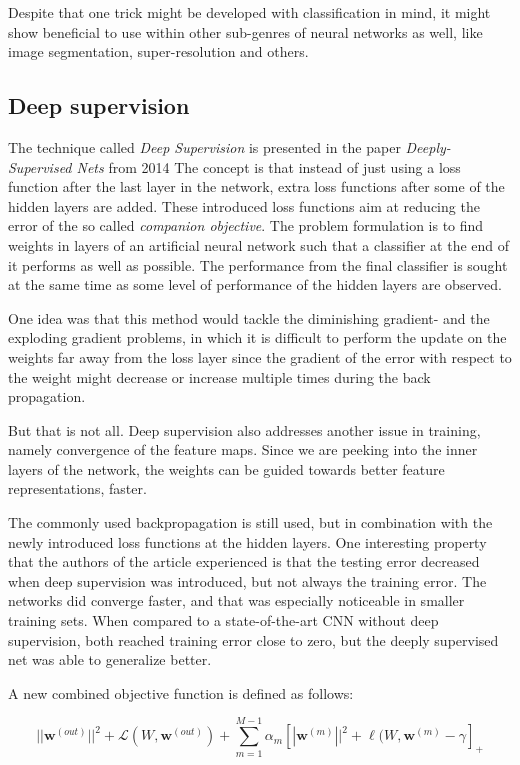 Despite that one trick might be developed with classification in mind, it might show beneficial to use within other sub-genres of neural networks as well, like image segmentation, super-resolution and others. 

\subsection{Deep supervision}
The technique called \emph{Deep Supervision} is presented in the paper \emph{Deeply-Supervised Nets} from 2014 %
The concept is that instead of just using a loss function after the last layer in the network, extra loss functions after some of the hidden layers are added. These introduced loss functions aim at reducing the error of the so called \emph{companion objective}. The problem formulation is to find weights in layers of an artificial neural network such that a classifier at the end of it performs as well as possible. The performance from the final classifier is sought at the same time as some level of performance of the hidden layers are observed. 

One idea was that this method would tackle the diminishing gradient- and the exploding gradient problems, in which it is difficult to perform the update on the weights far away from the loss layer since the gradient of the error with respect to the weight might decrease or increase multiple times during the back propagation. 

But that is not all. Deep supervision also addresses another issue in training, namely convergence of the feature maps. Since we are peeking into the inner layers of the network, the weights can be guided towards better feature representations, faster. 

The commonly used backpropagation is still used, but in combination with the newly introduced loss functions at the hidden layers. One interesting property that the authors of the article experienced is that the testing error decreased when deep supervision was introduced, but not always the training error. The networks did converge faster, and that was especially noticeable in smaller training sets. When compared to a state-of-the-art CNN without deep supervision, both reached training error close to zero, but the deeply supervised net was able to generalize better. 

A new combined objective function is defined as follows:

\begin{equation}
||\textbf{w}^{(out)}||^2 + \mathcal{L}(W, \textbf{w}^{(out)}) + \sum\limits_{m = 1}^{M - 1}\alpha_m[|\textbf{w}^{(m)}||^2 + \ell(W, \textbf{w}^{(m)} - \gamma]_+
\end{equation}

